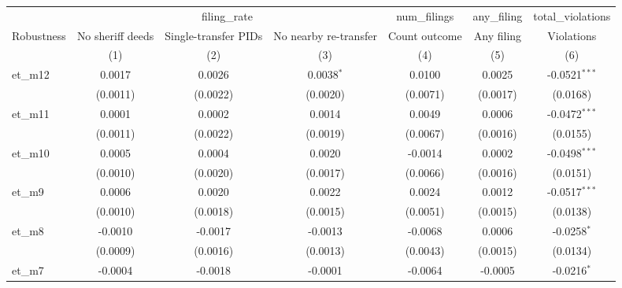 
\begingroup
\centering
\begin{tabular}{lcccccc}
   \toprule
    & \multicolumn{3}{c}{filing\_rate} & num\_filings & any\_filing & total\_violations\\
   Robustness         & No sheriff deeds & Single-transfer PIDs & No nearby re-transfer & Count outcome   & Any filing      & Violations \\   
                      & (1)              & (2)                  & (3)                   & (4)             & (5)             & (6)\\  
   \midrule 
   et\_m12            & 0.0017           & 0.0026               & 0.0038$^{*}$          & 0.0100          & 0.0025          & -0.0521$^{***}$\\   
                      & (0.0011)         & (0.0022)             & (0.0020)              & (0.0071)        & (0.0017)        & (0.0168)\\   
   et\_m11            & 0.0001           & 0.0002               & 0.0014                & 0.0049          & 0.0006          & -0.0472$^{***}$\\   
                      & (0.0011)         & (0.0022)             & (0.0019)              & (0.0067)        & (0.0016)        & (0.0155)\\   
   et\_m10            & 0.0005           & 0.0004               & 0.0020                & -0.0014         & 0.0002          & -0.0498$^{***}$\\   
                      & (0.0010)         & (0.0020)             & (0.0017)              & (0.0066)        & (0.0016)        & (0.0151)\\   
   et\_m9             & 0.0006           & 0.0020               & 0.0022                & 0.0024          & 0.0012          & -0.0517$^{***}$\\   
                      & (0.0010)         & (0.0018)             & (0.0015)              & (0.0051)        & (0.0015)        & (0.0138)\\   
   et\_m8             & -0.0010          & -0.0017              & -0.0013               & -0.0068         & 0.0006          & -0.0258$^{*}$\\   
                      & (0.0009)         & (0.0016)             & (0.0013)              & (0.0043)        & (0.0015)        & (0.0134)\\   
   et\_m7             & -0.0004          & -0.0018              & -0.0001               & -0.0064         & -0.0005         & -0.0216$^{*}$\\   

\end{tabular}
